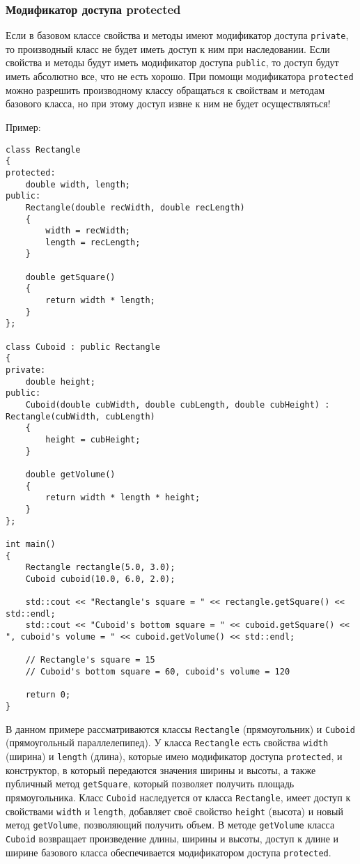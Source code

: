 \subsubsection{Модификатор доступа protected}
Если в базовом классе свойства и методы имеют модификатор доступа \lstinline|private|, то производный класс не будет иметь доступ к ним при наследовании. Если свойства и методы будут иметь модификатор доступа \lstinline|public|, то доступ будут иметь абсолютно все, что не есть хорошо. При помощи модификатора \lstinline|protected| можно разрешить производному классу обращаться к свойствам и методам базового класса, но при этому доступ извне к ним не будет осуществляться!

Пример:

\begin{lstlisting}
class Rectangle
{
protected:
    double width, length;
public:
    Rectangle(double recWidth, double recLength)
    {
        width = recWidth;
        length = recLength;
    }

    double getSquare()
    {
        return width * length;
    }
};

class Cuboid : public Rectangle
{
private:
    double height;
public:
    Cuboid(double cubWidth, double cubLength, double cubHeight) : Rectangle(cubWidth, cubLength)
    {
        height = cubHeight;
    }

    double getVolume()
    {
        return width * length * height;
    }
};

int main()
{
    Rectangle rectangle(5.0, 3.0);
    Cuboid cuboid(10.0, 6.0, 2.0);

    std::cout << "Rectangle's square = " << rectangle.getSquare() << std::endl;
    std::cout << "Cuboid's bottom square = " << cuboid.getSquare() << ", cuboid's volume = " << cuboid.getVolume() << std::endl;

    // Rectangle's square = 15
    // Cuboid's bottom square = 60, cuboid's volume = 120

    return 0;
}
\end{lstlisting}

В данном примере рассматриваются классы \lstinline|Rectangle| (прямоугольник) и \lstinline|Cuboid| (прямоугольный параллелепипед). У класса \lstinline|Rectangle| есть свойства \lstinline|width| (ширина) и \lstinline|length| (длина), которые имею модификатор доступа \lstinline|protected|, и конструктор, в который передаются значения ширины и высоты, а также публичный метод \lstinline|getSquare|, который позволяет получить площадь прямоугольника. Класс \lstinline|Cuboid| наследуется от класса \lstinline|Rectangle|, имеет доступ к свойствами \lstinline|width| и \lstinline|length|, добавляет своё свойство \lstinline|height| (высота) и новый метод \lstinline|getVolume|, позволяющий получить объем. В методе \lstinline|getVolume| класса \lstinline|Cuboid| возвращает произведение длины, ширины и высоты, доступ к длине и ширине базового класса обеспечивается модификатором доступа \lstinline|protected|.

